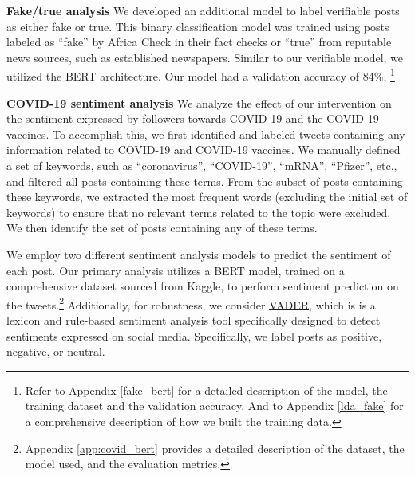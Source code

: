 \textbf{Fake/true analysis}
We developed an additional model to label verifiable posts as either fake or true. This binary classification model was trained using posts labeled as ``fake'' by Africa Check in their fact checks or ``true'' from reputable news sources, such as established newspapers. Similar to our verifiable model, we utilized the BERT architecture. Our model had a validation accuracy of 84\%, \footnote{Refer to Appendix \ref{fake_bert} for a detailed description of the model, the training dataset and the validation accuracy. And to Appendix \ref{lda_fake} for a comprehensive description of how we built the training data.} 

\textbf{COVID-19 sentiment analysis} %
We analyze the effect of our intervention on the sentiment expressed by followers towards COVID-19 and the COVID-19 vaccines. To accomplish this, we first identified and labeled tweets containing any information related to COVID-19 and COVID-19 vaccines. We manually defined a set of keywords, such as ``coronavirus'', ``COVID-19'', ``mRNA'', ``Pfizer'', etc., and filtered all posts containing these terms. From the subset of posts containing these keywords, we extracted the most frequent words (excluding the initial set of keywords) to ensure that no relevant terms related to the topic were excluded. We then identify the set of posts containing any of these terms.

We employ two different sentiment analysis models to predict the sentiment of each post. Our primary analysis utilizes a BERT model, trained on a comprehensive dataset sourced from Kaggle, to perform sentiment prediction on the tweets.\footnote{Appendix \ref{app:covid_bert} provides a detailed description of the dataset, the model used, and the evaluation metrics.} Additionally, for robustness, we consider \href{https://vadersentiment.readthedocs.io/en/latest/}{VADER}, which is is a lexicon and rule-based sentiment analysis tool specifically designed to detect sentiments expressed on social media. Specifically, we label posts as positive, negative, or neutral.

